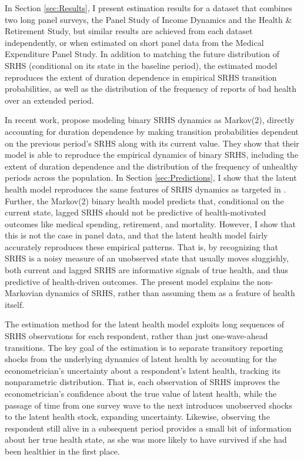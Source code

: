 \documentclass[12pt,pdftex,letterpaper]{article}
\begin{document}
In Section \ref{sec:Results}, I present estimation results for a dataset that combines two long panel surveys, the Panel Study of Income Dynamics and the Health \& Retirement Study, but similar results are achieved from each dataset independently, or when estimated on short panel data from the Medical Expenditure Panel Study. In addition to matching the future distribution of SRHS (conditional on its state in the baseline period), the estimated model reproduces the extent of duration dependence in empirical SRHS transition probabilities, as well as the distribution of the frequency of reports of bad health over an extended period.

In recent work, \cite{DeNardi18} propose modeling binary SRHS dynamics as Markov(2), directly accounting for duration dependence by making transition probabilities dependent on the previous period's SRHS along with its current value. They show that their model is able to reproduce the empirical dynamics of binary SRHS, including the extent of duration dependence and the distribution of the frequency of unhealthy periods across the population.  In Section \ref{sec:Predictions}, I show that the latent health model reproduces the same features of SRHS dynamics as targeted in \cite{DeNardi18}. Further, the Markov(2) binary health model predicts that, conditional on the current state, lagged SRHS should not be predictive of health-motivated outcomes like medical spending, retirement, and mortality. However, I show that this is not the case in panel data, and that the latent health model fairly accurately reproduces these empirical patterns. That is, by recognizing that SRHS is a noisy measure of an unobserved state that usually moves sluggishly, both current and lagged SRHS are informative signals of true health, and thus predictive of health-driven outcomes. The present model explains the non-Markovian dynamics of SRHS, rather than assuming them as a feature of health itself.

The estimation method for the latent health model exploits long sequences of SRHS observations for each respondent, rather than just one-wave-ahead transitions. The key goal of the estimation is to separate transitory reporting shocks from the underlying dynamics of latent health by accounting for the econometrician's uncertainty about a respondent's latent health, tracking its nonparametric distribution. That is, each observation of SRHS improves the econometrician's confidence about the true value of latent health, while the passage of time from one survey wave to the next introduces unobserved shocks to the latent health stock, expanding uncertainty. Likewise, observing the respondent still alive in a subsequent period provides a small bit of information about her true health state, as she was more likely to have survived if she had been healthier in the first place.
\end{document}
